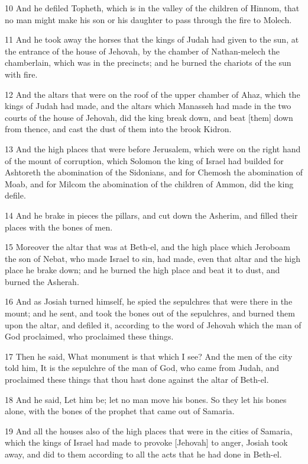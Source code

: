 \par 10 And he defiled Topheth, which is in the valley of the children of Hinnom, that no man might make his son or his daughter to pass through the fire to Molech.
\par 11 And he took away the horses that the kings of Judah had given to the sun, at the entrance of the house of Jehovah, by the chamber of Nathan-melech the chamberlain, which was in the precincts; and he burned the chariots of the sun with fire.
\par 12 And the altars that were on the roof of the upper chamber of Ahaz, which the kings of Judah had made, and the altars which Manasseh had made in the two courts of the house of Jehovah, did the king break down, and beat [them] down from thence, and cast the dust of them into the brook Kidron.
\par 13 And the high places that were before Jerusalem, which were on the right hand of the mount of corruption, which Solomon the king of Israel had builded for Ashtoreth the abomination of the Sidonians, and for Chemosh the abomination of Moab, and for Milcom the abomination of the children of Ammon, did the king defile.
\par 14 And he brake in pieces the pillars, and cut down the Asherim, and filled their places with the bones of men.
\par 15 Moreover the altar that was at Beth-el, and the high place which Jeroboam the son of Nebat, who made Israel to sin, had made, even that altar and the high place he brake down; and he burned the high place and beat it to dust, and burned the Asherah.
\par 16 And as Josiah turned himself, he spied the sepulchres that were there in the mount; and he sent, and took the bones out of the sepulchres, and burned them upon the altar, and defiled it, according to the word of Jehovah which the man of God proclaimed, who proclaimed these things.
\par 17 Then he said, What monument is that which I see? And the men of the city told him, It is the sepulchre of the man of God, who came from Judah, and proclaimed these things that thou hast done against the altar of Beth-el.
\par 18 And he said, Let him be; let no man move his bones. So they let his bones alone, with the bones of the prophet that came out of Samaria.
\par 19 And all the houses also of the high places that were in the cities of Samaria, which the kings of Israel had made to provoke [Jehovah] to anger, Josiah took away, and did to them according to all the acts that he had done in Beth-el.
